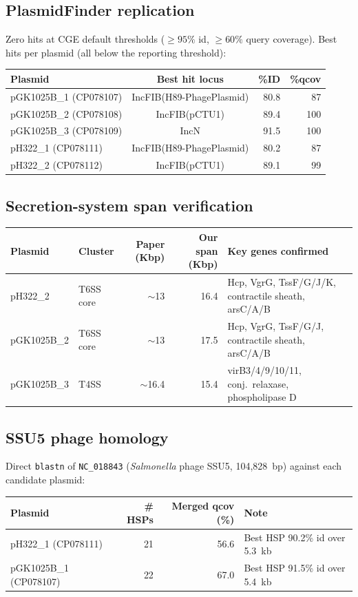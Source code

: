 \documentclass[11pt]{article}
\begin{document}
\subsection{PlasmidFinder replication}
Zero hits at CGE default thresholds ($\geq 95\%$ id, $\geq 60\%$ query coverage). Best hits per
plasmid (all below the reporting threshold):
\begin{tabular}{lcrr}
\toprule
Plasmid & Best hit locus & \%ID & \%qcov \\
\midrule
pGK1025B\_1 (CP078107) & IncFIB(H89-PhagePlasmid) & 80.8 & 87 \\
pGK1025B\_2 (CP078108) & IncFIB(pCTU1)            & 89.4 & 100 \\
pGK1025B\_3 (CP078109) & IncN                     & 91.5 & 100 \\
pH322\_1  (CP078111)   & IncFIB(H89-PhagePlasmid) & 80.2 & 87 \\
pH322\_2  (CP078112)   & IncFIB(pCTU1)            & 89.1 & 99  \\
\bottomrule
\end{tabular}

\subsection{Secretion-system span verification}
\begin{tabular}{llrrl}
\toprule
Plasmid & Cluster & Paper (Kbp) & Our span (Kbp) & Key genes confirmed \\
\midrule
pH322\_2     & T6SS core & $\sim$13 & 16.4 & Hcp, VgrG, TssF/G/J/K, contractile sheath, arsC/A/B \\
pGK1025B\_2  & T6SS core & $\sim$13 & 17.5 & Hcp, VgrG, TssF/G/J, contractile sheath, arsC/A/B \\
pGK1025B\_3  & T4SS      & $\sim$16.4 & 15.4 & virB3/4/9/10/11, conj.\ relaxase, phospholipase D \\
\bottomrule
\end{tabular}

\subsection{SSU5 phage homology}
Direct \texttt{blastn} of \texttt{NC\_018843} (\emph{Salmonella} phage SSU5, 104{,}828~bp) against
each candidate plasmid:
\begin{tabular}{lrrl}
\toprule
Plasmid & \# HSPs & Merged qcov (\%) & Note \\
\midrule
pH322\_1 (CP078111)    & 21 & 56.6 & Best HSP 90.2\% id over 5.3~kb \\
pGK1025B\_1 (CP078107) & 22 & 67.0 & Best HSP 91.5\% id over 5.4~kb \\
\bottomrule
\end{tabular}
\end{document}
